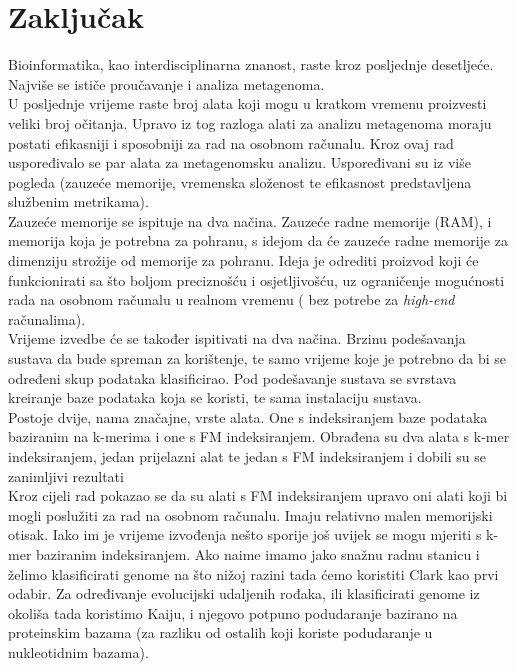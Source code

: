 \documentclass[times, utf8, seminar]{fer}
\begin{document}
\chapter{Zaključak}
Bioinformatika, kao interdisciplinarna znanost, raste kroz posljednje desetljeće. Najviše se ističe proučavanje i analiza metagenoma.
\\U posljednje vrijeme raste broj alata koji mogu u kratkom vremenu proizvesti veliki broj očitanja. Upravo iz tog razloga alati za analizu metagenoma moraju postati efikasniji i sposobniji za rad na osobnom računalu. Kroz ovaj rad uspoređivalo se par alata za metagenomsku analizu. Uspoređivani su iz više pogleda (zauzeće memorije, vremenska složenost te efikasnost predstavljena službenim metrikama).
\\Zauzeće memorije se ispituje na dva načina. Zauzeće radne memorije (RAM), i memorija koja je potrebna za pohranu, s idejom da će zauzeće radne memorije za dimenziju strožije od memorije za pohranu. Ideja je odrediti proizvod koji će funkcionirati sa što boljom preciznošću i osjetljivošću, uz ograničenje mogućnosti rada na osobnom računalu u realnom vremenu ( bez potrebe za \textit{high-end} računalima).
\\Vrijeme izvedbe će se također ispitivati na dva načina. Brzinu podešavanja sustava da bude spreman za korištenje, te samo vrijeme koje je potrebno da bi se određeni skup podataka klasificirao. Pod podešavanje sustava se svrstava kreiranje baze podataka koja se koristi, te sama instalaciju sustava.
\\Postoje dvije, nama značajne, vrste alata. One s indeksiranjem baze podataka baziranim na k-merima i one s FM indeksiranjem. Obrađena su dva alata s k-mer indeksiranjem, jedan prijelazni alat te jedan s FM indeksiranjem i dobili su se zanimljivi rezultati
\\Kroz cijeli rad pokazao se da su alati s FM indeksiranjem upravo oni alati koji bi mogli poslužiti za rad na osobnom računalu. Imaju relativno malen memorijski otisak. Iako im je vrijeme izvođenja nešto sporije još uvijek se mogu mjeriti s k-mer baziranim indeksiranjem. Ako naime imamo jako snažnu radnu stanicu i želimo klasificirati genome na što nižoj razini tada ćemo koristiti Clark kao prvi odabir. Za određivanje evolucijski udaljenih rođaka, ili klasificirati genome iz okoliša tada koristimo Kaiju, i njegovo potpuno podudaranje bazirano na proteinskim bazama (za razliku od ostalih koji koriste podudaranje u nukleotidnim bazama).



\end{document}

